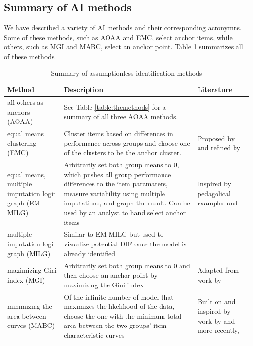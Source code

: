 \documentclass[
  11pt,
]{article}
\begin{document}
\hypertarget{summary-of-ai-methods}{%
\subsection{Summary of AI methods}\label{summary-of-ai-methods}}

We have described a variety of AI methods and their corresponding acronymns. Some of these methods, such as AOAA and EMC, select anchor items, while others, such as MGI and MABC, select an anchor point. Table \ref{table:allmethods} summarizes all of these methods.

\begin{table}[H]
\caption{Summary of assumptionless identification methods}
\centering
\begin{tabular}{|p{4cm}|p{6cm}|p{4cm}|}
\toprule

Method & Description & Literature \\

\midrule

all-others-as-anchors (AOAA) & See Table \ref{table:themethods} for a summary of all three AOAA methods. &  \\\hline

equal means clustering (EMC) & Cluster items based on differences in performance across groups and choose one of the clusters to be the anchor cluster. & Proposed by \cite{bechger2015statistical} and refined by \cite{pohl2017cluster} \\\hline

equal means, multiple imputation logit graph (EM-MILG) & Arbitrarily set both group means to 0, which pushes all group performance differences to the item paramaters, measure variability using multiple imputations, and graph the result. Can be used by an analyst to hand select anchor items & Inspired by pedagolical examples \cite{pohl2017cluster} and \cite{talbot2013taking} \\\hline

multiple imputation logit graph (MILG) & Similar to EM-MILG but used to visualize potential DIF once the model is already identified &  \\\hline

maximizing Gini index (MGI) & Arbitrarily set both group means to 0 and then choose an anchor point by maximizing the Gini index & Adapted from work by \cite{strobl2018anchor} \\\hline

minimizing the area between curves (MABC) & Of the infinite number of model that maximizes the likelihood of the data, choose the one with the minimum total area between the two groups' item characteristic curves & Built on and inspired by work by \cite{raju1988area} and more recently, \cite{chalmers2016might} \\

\bottomrule
\end{tabular}
\label{table:allmethods}
\end{table}
\end{document}

